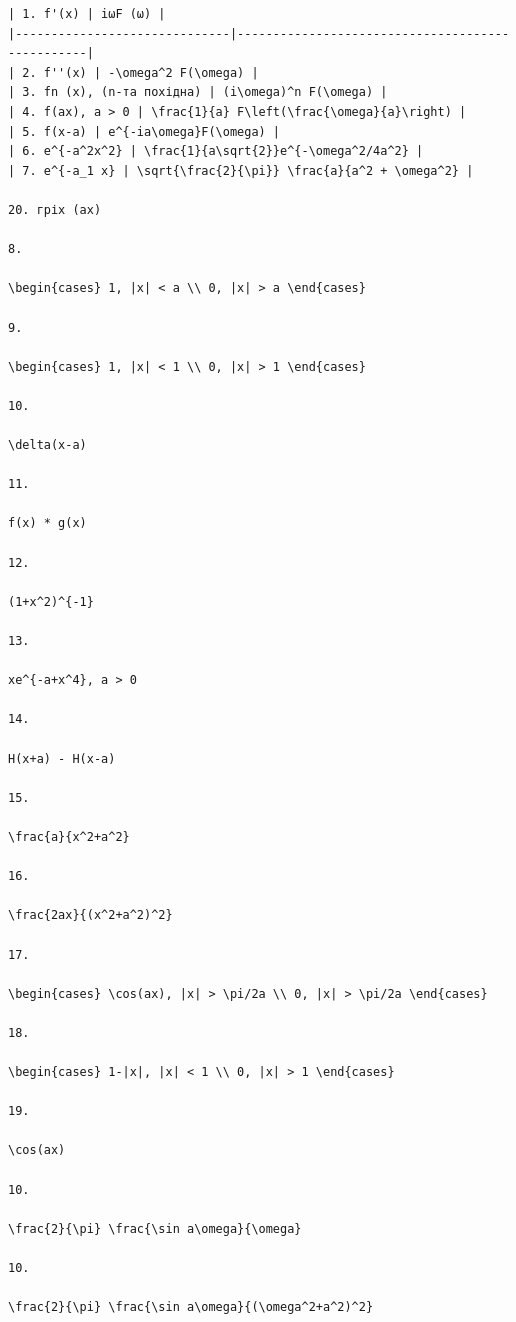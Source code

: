 \documentclass[
  ukrainian,
]{article}
\begin{document}
\begin{verbatim}
| 1. f'(x) | iωF (ω) |
|------------------------------|-------------------------------------------------|
| 2. f''(x) | -\omega^2 F(\omega) |
| 3. fn (x), (n-та похідна) | (i\omega)^n F(\omega) |
| 4. f(ax), a > 0 | \frac{1}{a} F\left(\frac{\omega}{a}\right) |
| 5. f(x-a) | e^{-ia\omega}F(\omega) |
| 6. e^{-a^2x^2} | \frac{1}{a\sqrt{2}}e^{-\omega^2/4a^2} |
| 7. e^{-a_1 x} | \sqrt{\frac{2}{\pi}} \frac{a}{a^2 + \omega^2} |

20. гріх (ax)

8.

\begin{cases} 1, |x| < a \\ 0, |x| > a \end{cases}

9.

\begin{cases} 1, |x| < 1 \\ 0, |x| > 1 \end{cases}

10.

\delta(x-a)

11.

f(x) * g(x)

12.

(1+x^2)^{-1}

13.

xe^{-a+x^4}, a > 0

14.

H(x+a) - H(x-a)

15.

\frac{a}{x^2+a^2}

16.

\frac{2ax}{(x^2+a^2)^2}

17.

\begin{cases} \cos(ax), |x| > \pi/2a \\ 0, |x| > \pi/2a \end{cases}

18.

\begin{cases} 1-|x|, |x| < 1 \\ 0, |x| > 1 \end{cases}

19.

\cos(ax)

10.

\frac{2}{\pi} \frac{\sin a\omega}{\omega}

10.

\frac{2}{\pi} \frac{\sin a\omega}{(\omega^2+a^2)^2}


\end{verbatim}
\end{document}
